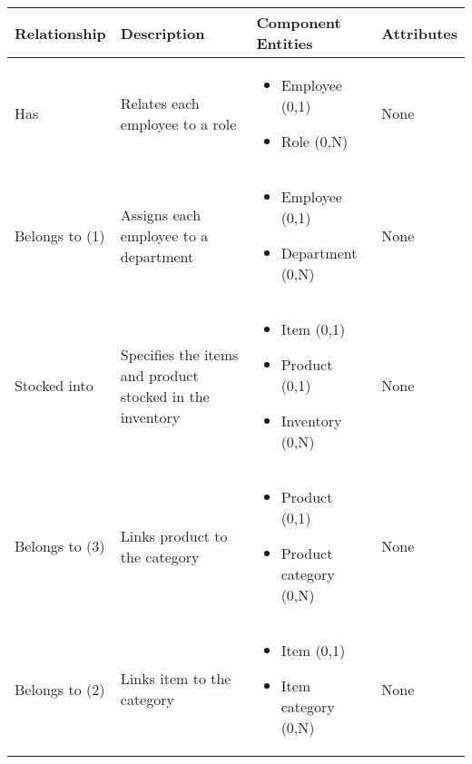 \begin{longtable}{|p{}|p{} |p{}|p{} |} 
\hline
\textbf{Relationship} & \textbf{Description} & \textbf{Component Entities} & \textbf{Attributes} \\\hline


Has & Relates each employee to a role & \begin{itemize}
        \vspace{-1em}
        \item Employee (0,1)
        \item Role (0,N)
    \end{itemize}
 &  None \\\hline
 
Belongs to (1) & Assigns each employee to a department & \begin{itemize}
        \vspace{-1em}
        \item Employee (0,1)
        \item Department (0,N)
    \end{itemize}
 &  None \\\hline

Stocked into & Specifies the items and product stocked in the inventory & \begin{itemize}
	\vspace{-1em}
	\item Item (0,1)
	\item Product (0,1)
	\item Inventory (0,N)
\end{itemize}
&  None \\\hline

Belongs to (3) & Links product to the category  & \begin{itemize}
	\vspace{-1em}
	\item Product (0,1)
	\item Product category (0,N)
\end{itemize}
&  None \\\hline

Belongs to (2) & Links item to the category & \begin{itemize}
	\vspace{-1em}
	\item Item (0,1)
	\item Item category (0,N)
\end{itemize}
&  None \\\hline


\end{longtable}
